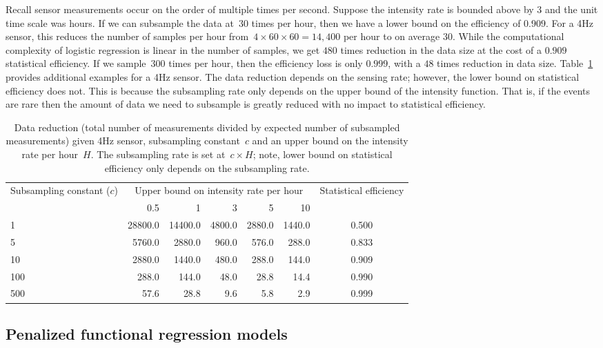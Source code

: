 \documentclass[11pt]{amsart}
\begin{document}
Recall sensor measurements occur on the order of multiple times per second.  Suppose the intensity rate is bounded above by $3$ and the unit time scale was hours. If we can subsample the data at~$30$ times per hour, then we have a lower bound on the efficiency of $0.909$. For a 4Hz sensor, this reduces the number of samples per hour from~$4 \times 60 \times 60 = 14,400$ per hour to on average $30$. While the computational complexity of logistic regression is linear in the number of samples, we get $480$ times reduction in the data size at the cost of a $0.909$ statistical efficiency. If we sample~$300$ times per hour, then the efficiency loss is only $0.999$, with a $48$ times reduction in data size. Table~\ref{tab:compvseff} provides additional examples for a 4Hz sensor.  The data reduction depends on the sensing rate; however, the lower bound on statistical efficiency does not.  This is because the subsampling rate only depends on the upper bound of the intensity function. That is, if the events are rare then the amount of data we need to subsample is greatly reduced with no impact to statistical efficiency.

\begin{table}[!th]
\centering
\begin{tabular}{l r r r r r | c}
\multirow{2}{2.5cm}{Subsampling constant ($c$)}
  & \multicolumn{5}{c}{Upper bound on intensity rate per
    hour}
  & \multirow{2}{2cm}{Statistical efficiency}\\ \cline{2-6}
& 0.5 & 1 & 3 & 5 & 10 \\ \hline
1 & 28800.0 & 14400.0 & 4800.0 & 2880.0 & 1440.0 & 0.500 \\
5 & 5760.0 & 2880.0 & 960.0 & 576.0 & 288.0 & 0.833 \\
10 & 2880.0 & 1440.0 & 480.0 & 288.0 & 144.0 & 0.909 \\
100 & 288.0 & 144.0 & 48.0 & 28.8 & 14.4 & 0.990 \\
500 & 57.6 & 28.8 & 9.6 & 5.8 & 2.9 & 0.999 \\ \hline
\end{tabular}
\caption{Data reduction (total number of measurements divided by expected number of subsampled measurements) given 4Hz sensor, subsampling constant~$c$ and an upper bound on the intensity rate per hour~$H$. The subsampling rate is set at~$c \times H$; note, lower bound on statistical efficiency only depends on the subsampling rate.}
\label{tab:compvseff}
\end{table}

\subsection{Penalized functional regression models}
\end{document}
